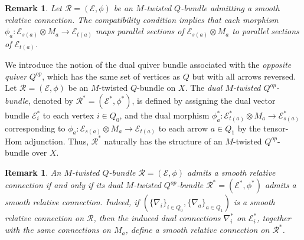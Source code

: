 \documentclass[12pt, reqno]{amsart}
\theoremstyle{plain}
\newtheorem{remark}[theorem]{Remark}
\numberwithin{equation}{section}
\begin{document}
	\begin{remark}
		\rm
		Let $\mathcal{R}=(\mathcal{E},\phi)$ be an $M$-twisted $Q$-bundle admitting a smooth relative connection. The compatibility condition implies that each morphism
		$\phi_a : \mathcal{E}_{s(a)} \otimes M_a \to \mathcal{E}_{t(a)}$ maps parallel sections of
		$\mathcal{E}_{s(a)} \otimes M_a$ to parallel sections of $\mathcal{E}_{t(a)}$.
	\end{remark}
	
	
We introduce the notion of the dual quiver bundle associated with the \emph{opposite quiver} $Q^{op}$, which has the same set of vertices as $Q$ but with all arrows reversed. Let $\mathcal{R}=(\mathcal{E}, \phi)$ be an $M$-twisted $Q$-bundle on $X$. The \emph{dual $M$-twisted $Q^{op}$-bundle}, denoted by $\mathcal{R}^*=(\mathcal{E}^*, \phi^*)$, is defined by assigning the dual vector bundle $\mathcal{E}_i^*$ to each vertex $i\in Q_0$, and the dual morphism $\phi_a^*: \mathcal{E}_{t(a)}^* \otimes M_a \rightarrow \mathcal{E}_{s(a)}^*$  corresponding to $\phi_a: \mathcal{E}_{s(a)} \otimes M_a \rightarrow \mathcal{E}_{t(a)}$ to each arrow $a\in Q_1$ by the tensor-Hom adjunction. Thus, $\mathcal{R}^*$ naturally has the structure of an $M$-twisted $Q^{op}$-bundle over $X$.


\begin{remark}
	\rm	An \(M\)-twisted $Q$-bundle \(\mathcal{R}=(\mathcal{E},\phi)\) admits a smooth relative connection if and only if its dual $M$-twisted $Q^{op}$-bundle \(\mathcal{R}^*=(\mathcal{E}^*,\phi^*)\) admits a smooth relative connection. Indeed, if $(\{\nabla_{i}\}_{i\in Q_0}, \{\nabla_a\}_{a\in Q_1})$ is a smooth relative connection on \(\mathcal{R}\), then the induced dual connections \(\nabla_i^*\) on \(\mathcal{E}_i^*\), together with the same connections on \(M_a\), define a smooth relative connection on $\mathcal{R}^*$.
\end{remark}
\end{document}
